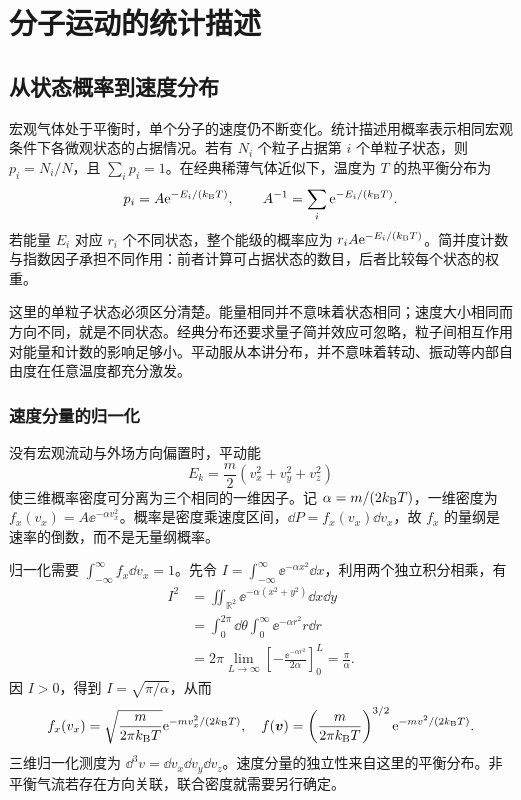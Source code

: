 \chapter{分子运动的统计描述}

\section{从状态概率到速度分布}
\label{th:mb}
宏观气体处于平衡时，单个分子的速度仍不断变化。统计描述用概率表示相同宏观条件下各微观状态的占据情况。若有 $N_i$ 个粒子占据第 $i$ 个单粒子状态，则 $p_i=N_i/N$，且 $\sum_i p_i=1$。在经典稀薄气体近似下，温度为 $T$ 的热平衡分布为
\begin{equation}
 p_i=A\mathrm e^{-E_i/(k_{\mathrm B} T)},\qquad A^{-1}=\sum_i\mathrm e^{-E_i/(k_{\mathrm B} T)}.
\end{equation}
若能量 $E_i$ 对应 $r_i$ 个不同状态，整个能级的概率应为 $r_iA\mathrm e^{-E_i/(k_{\mathrm B} T)}$。简并度计数与指数因子承担不同作用：前者计算可占据状态的数目，后者比较每个状态的权重。

这里的单粒子状态必须区分清楚。能量相同并不意味着状态相同；速度大小相同而方向不同，就是不同状态。经典分布还要求量子简并效应可忽略，粒子间相互作用对能量和计数的影响足够小。平动服从本讲分布，并不意味着转动、振动等内部自由度在任意温度都充分激发。

\subsection{速度分量的归一化}
\label{th:gaussian}
没有宏观流动与外场方向偏置时，平动能
\[
 E_k=\frac m2(v_x^2+v_y^2+v_z^2)
\]
使三维概率密度可分离为三个相同的一维因子。记 $\alpha=m/(2k_{\mathrm B} T)$，一维密度为 $f_x(v_x)=A\ee^{-\alpha v_x^2}$。概率是密度乘速度区间，$\dd P=f_x(v_x)\dd v_x$，故 $f_x$ 的量纲是速率的倒数，而不是无量纲概率。

归一化需要 $\int_{-\infty}^{\infty}f_x\dd v_x=1$。先令 $I=\int_{-\infty}^{\infty}\ee^{-\alpha x^2}\dd x$，利用两个独立积分相乘，有
\begin{align}
 I^2&=\iint_{\mathbb R^2}\ee^{-\alpha(x^2+y^2)}\dd x\dd y\\
 &=\int_0^{2\pi}\dd\theta\int_0^\infty \ee^{-\alpha r^2}r\dd r\\
 &=2\pi\lim_{L\to\infty}
 \left[-\frac{\ee^{-\alpha r^2}}{2\alpha}\right]_0^L
 =\frac\pi\alpha.
\end{align}
因 $I>0$，得到 $I=\sqrt{\pi/\alpha}$，从而
\begin{equation}\label{eq:maxwellvector}
 f_x(v_x)=\sqrt{\frac{m}{2\pi k_{\mathrm B} T}}\mathrm e^{-mv_x^2/(2k_{\mathrm B} T)},\quad
 f(\bm{v})=\left(\frac{m}{2\pi k_{\mathrm B} T}\right)^{3/2}\mathrm e^{-mv^2/(2k_{\mathrm B} T)}.
\end{equation}
三维归一化测度为 $\dd^3v=\dd v_x\dd v_y\dd v_z$。速度分量的独立性来自这里的平衡分布。非平衡气流若存在方向关联，联合密度就需要另行确定。

